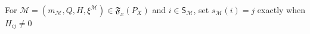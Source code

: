 For \(\mathcal M=(m_{\mathcal M},Q,H,\xi^{\mathcal M})\in\mathfrak F_x(P_X)\) and \(i\in\mathsf S_{\mathcal M}\), set \(s_{\mathcal M}(i)=j\) exactly when \(H_{ij}\ne0\)